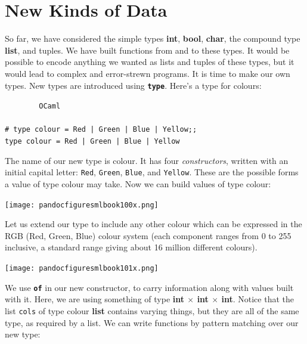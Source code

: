 \documentclass[]{book}
\newcommand{\pof}{\textbf{of}\xspace}
\newcommand{\smspace}{\vspace{4mm}}
\begin{document}
\cleardoublepage
\thispagestyle{empty}


\pagestyle{empty}


\chapter{New Kinds of Data}
\pagestyle{fancy}

So far, we have considered the simple types \textbf{\textsf{int}}, \textbf{\textsf{bool}}, \textbf{\textsf{char}}, the compound type \textbf{\textsf{list}}, and tuples. We have built functions from and to these types. It would be possible to encode anything we wanted as lists and tuples of these types, but it would lead to complex and error-strewn programs. It is time to make our own types. New types are introduced using \texttt{\textbf{type}}. Here's a type for colours:

\smspace
\noindent\verb!        OCaml!\\
\noindent\\
\noindent\verb!# type colour = Red | Green | Blue | Yellow;;!\\
\noindent\verb!type colour = Red | Green | Blue | Yellow!
\smspace

\noindent The name of our new type is \textsf{colour}. It has four \textit{constructors}, written with an initial capital letter: \texttt{Red}, \texttt{Green}, \texttt{Blue}, and \texttt{Yellow}. These are the possible forms a value of type \textsf{colour} may take. Now we can build values of type \textsf{colour}:

\medskip
\begin{center}
\noindent\texttt{[image: pandocfiguresmlbook100x.png]}
\end{center}
\medskip

\noindent Let us extend our type to include any other colour which can be expressed in the RGB (Red, Green, Blue) colour system (each component ranges from 0 to 255 inclusive, a standard range giving about 16 million different colours). 

\medskip
\begin{center}
\noindent\texttt{[image: pandocfiguresmlbook101x.png]}
\end{center}
\medskip

\noindent We use \texttt{\pof} in our new constructor, to carry information along with values built with it. Here, we are using something of type \textsf{\textbf{int $\times$ int $\times$ int}}. Notice that the list \texttt{cols} of type \textsf{colour \textbf{list}} contains  varying things, but they are all of the same type, as required by a list. We can write functions by pattern matching over our new type:
\end{document}
